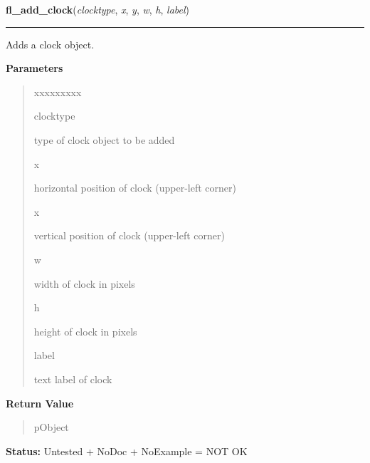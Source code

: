 \hspace{.8\funcindent}\begin{boxedminipage}{\funcwidth}

    \raggedright \textbf{fl\_add\_clock}(\textit{clocktype}, \textit{x}, \textit{y}, \textit{w}, \textit{h}, \textit{label})

    \vspace{-1.5ex}

    \rule{\textwidth}{0.5\fboxrule}
\setlength{\parskip}{2ex}
    Adds a clock object.

\setlength{\parskip}{1ex}
      \textbf{Parameters}
      \vspace{-1ex}

      \begin{quote}
        \begin{Ventry}{xxxxxxxxx}

          \item[clocktype]

          type of clock object to be added

          \item[x]

          horizontal position of clock (upper-left corner)

          \item[x]

          vertical position of clock (upper-left corner)

          \item[w]

          width of clock in pixels

          \item[h]

          height of clock in pixels

          \item[label]

          text label of clock

        \end{Ventry}

      \end{quote}

      \textbf{Return Value}
    \vspace{-1ex}

      \begin{quote}
      pObject

      \end{quote}

\textbf{Status:} Untested + NoDoc + NoExample = NOT OK



    \end{boxedminipage}

